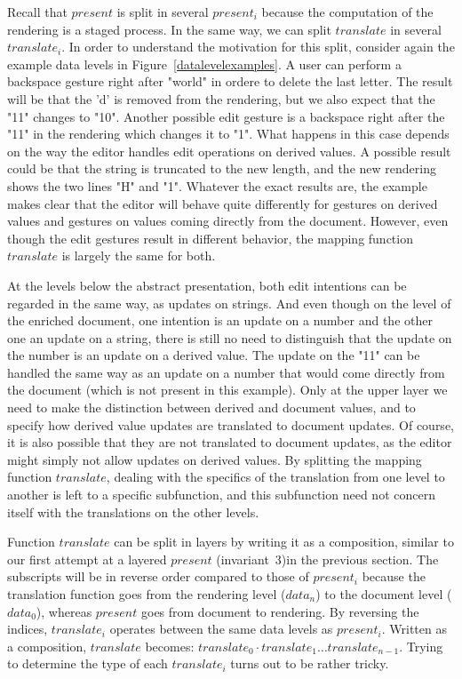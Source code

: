 Recall that $present$ is split in several $present_i$ because the computation of the rendering is a staged process. In the same way, we can split $translate$ in several $translate_i$. In order to understand the motivation for this split, consider again the example data levels in Figure~\ref{datalevelexamples}. A user can perform a backspace gesture right after "world" in ordere to delete the last letter. The result will be that the 'd' is removed from the rendering, but we also expect that the "11" changes to "10". Another possible edit gesture is a backspace right after the "11" in the rendering which changes it to "1". What happens in this case depends on the way the editor handles edit operations on derived values. A possible result could be that the string is truncated to the new length, and the new rendering shows the two lines "{H}" and "{1}". Whatever the exact results are, the example makes clear that the editor will behave quite differently for gestures on derived values and gestures on values coming directly from the document. However, even though the edit gestures result in different behavior, the mapping function $translate$ is largely the same for both.

At the levels below the abstract presentation, both edit intentions can be regarded in the same way, as updates on strings. And even though on the level of the enriched document, one intention is an update on a number and the other one an update on a string, there is still no need to distinguish that the update on the number is an update on a derived value. The update on the "11" can be handled the same way as an update on a number that would come directly from the document (which is not present in this example). Only at the upper layer we need to make the distinction between derived and document values, and to specify how derived value updates are translated to document updates. Of course, it is also possible that they are not translated to document updates, as the editor might simply not allow updates on derived values. By splitting the mapping function $translate$, dealing with the specifics of the translation from one level to another is left to a specific subfunction, and this subfunction need not concern itself with the translations on the other levels.

Function $translate$ can be split in layers by writing it as a composition, similar to our first attempt at a layered $present$ (invariant~3)in the previous section. The subscripts will be in reverse order compared to those of $present_i$ because the translation function goes from the rendering level ($data_n$) to the document level ($data_0$), whereas $present$ goes from document to rendering. By reversing the indices, $translate_i$ operates between the same data levels as $present_i$. Written as a composition, $translate$ becomes: $translate_0 \cdot translate_1 \dots translate_{n-1}$. Trying to determine the type of each $translate_i$ turns out to be rather tricky.

